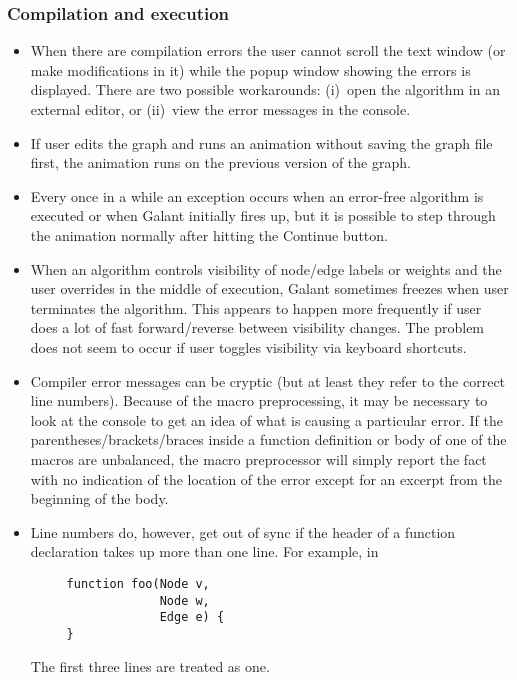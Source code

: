 \subsubsection*{Compilation and execution}

\begin{itemize}

\item
  When there are compilation errors the user cannot scroll the text window
  (or make modifications in it) while the popup window showing the errors is
  displayed. There are two possible workarounds: (i)~open the algorithm in an
  external editor, or (ii)~view the error messages in the console.

\item
  If user edits the graph and runs an animation without saving the graph file
  first, the animation runs on the previous version of the graph.

\item Every once in a while an exception occurs when an error-free algorithm
  is executed or when Galant initially fires up, but it is possible to step
  through the animation normally after hitting the \textsf{Continue} button.

\item When an algorithm controls visibility of node/edge labels or weights
  and the user overrides in the middle of execution, Galant sometimes freezes
  when user terminates the algorithm. This appears to happen more frequently
  if user does a lot of fast forward/reverse between visibility changes. The
  problem does not seem to occur if user toggles visibility via keyboard
  shortcuts.

\item
  Compiler error messages can be cryptic (but at least they refer to the correct
  line numbers). Because of the macro preprocessing,
  it may be necessary to look at the console
  to get an idea of what is causing a particular error.
  If the parentheses/brackets/braces inside a function definition or body of
  one of the  macros are unbalanced, the macro preprocessor
  will simply report the fact with no indication of the location of the error
  except for an excerpt from the beginning of the body.

\item Line numbers do, however, get out of sync if the header of a function
  declaration takes up more than one line. For example, in
\begin{verbatim}
     function foo(Node v,
                  Node w,
                  Edge e) {
     }
\end{verbatim}
The first three lines are treated as one.


\end{itemize}
